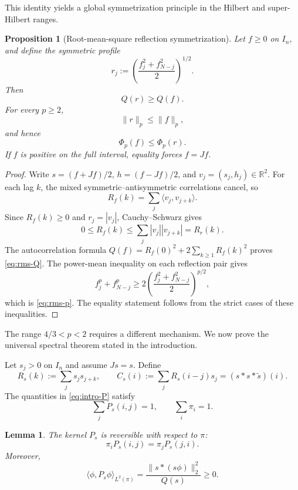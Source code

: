 \documentclass[11pt,reqno]{amsart}
\numberwithin{equation}{section}
\newtheorem{proposition}[proposition]{Proposition}
\newtheorem{lemma}[lemma]{Lemma}
\theoremstyle{definition}
\theoremstyle{remark}
\newcommand{\R}{\mathbb R}
\newcommand{\norm}[1]{\lVert #1\rVert}
\newcommand{\ip}[2]{\langle #1,#2\rangle}
\newcommand{\rev}{\widetilde}
\begin{document}
This identity yields a global symmetrization principle in the Hilbert and
super-Hilbert ranges.

\begin{proposition}[Root-mean-square reflection symmetrization]\label{prop:rms-symmetry}
Let $f\ge0$ on $I_n$, and define the symmetric profile
\begin{equation}\label{eq:rms}
  r_j:=\left(\frac{f_j^2+f_{N-j}^2}{2}\right)^{1/2}.
\end{equation}
Then
\begin{equation}\label{eq:rms-Q}
  Q(r)\ge Q(f).
\end{equation}
For every $p\ge2$,
\begin{equation}\label{eq:rms-p}
  \norm r_p\le\norm f_p,
\end{equation}
and hence
\begin{equation}\label{eq:rms-Phi}
  \Phi_p(f)\le\Phi_p(r).
\end{equation}
If $f$ is positive on the full interval, equality forces $f=Jf$.
\end{proposition}

\begin{proof}
Write $s=(f+Jf)/2$, $h=(f-Jf)/2$, and $v_j=(s_j,h_j)\in\R^2$.
For each lag $k$, the mixed symmetric--antisymmetric correlations cancel,
so
\[
  R_f(k)=\sum_j\ip{v_j}{v_{j+k}}.
\]
Since $R_f(k)\ge0$ and $r_j=|v_j|$, Cauchy--Schwarz gives
\[
  0\le R_f(k)\le\sum_j|v_j||v_{j+k}|=R_r(k).
\]
The autocorrelation formula
$Q(f)=R_f(0)^2+2\sum_{k\ge1}R_f(k)^2$ proves \eqref{eq:rms-Q}.
The power-mean inequality on each reflection pair gives
\[
  f_j^p+f_{N-j}^p
  \ge2\left(\frac{f_j^2+f_{N-j}^2}{2}\right)^{p/2},
\]
which is \eqref{eq:rms-p}.  The equality statement follows from the strict
cases of these inequalities.
\end{proof}

The range $4/3<p<2$ requires a different mechanism.  We now prove the
universal spectral theorem stated in the introduction.

Let $s_j>0$ on $I_n$ and assume $Js=s$.  Define
\begin{equation}\label{eq:RsCs}
  R_s(k):=\sum_j s_js_{j+k},
  \qquad
  C_s(i):=\sum_j R_s(i-j)s_j=(s*s*\rev s)(i).
\end{equation}
The quantities in \eqref{eq:intro-P} satisfy
\[
  \sum_jP_s(i,j)=1,
  \qquad
  \sum_i\pi_i=1.
\]

\begin{lemma}\label{lem:Ps-positive}
The kernel $P_s$ is reversible with respect to $\pi$:
\begin{equation}\label{eq:detailed-balance}
  \pi_iP_s(i,j)=\pi_jP_s(j,i).
\end{equation}
Moreover,
\begin{equation}\label{eq:Ps-quadratic}
  \ip{\phi}{P_s\phi}_{L^2(\pi)}
  =\frac{\norm{s*(s\phi)}_2^2}{Q(s)}\ge0.
\end{equation}
\end{lemma}
\end{document}
